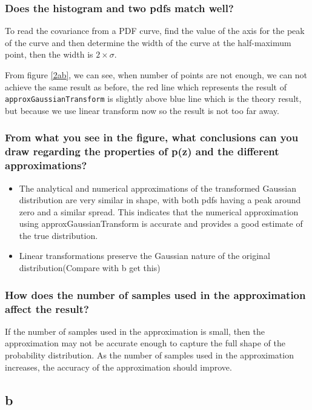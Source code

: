 \subsubsection{Does the histogram and two pdfs match well? }

To read the covariance from a PDF curve, find the value of the axis for the peak of the curve and then determine the width of the curve at the half-maximum point, then the width is $ 2 \times \sigma $. 


From figure \ref{2ab}, we can see, when number of points are not enough, we can not achieve the same result as before, the red line which represents the result of \texttt{approxGaussianTransform}  is slightly above blue line which is the theory result, but because we use linear transform now so the result is not too far away.

\subsubsection{From what you see in the figure, what conclusions can you draw regarding the properties of p(z) and the different approximations? }

\begin{itemize}
    \item The analytical and numerical approximations of the transformed Gaussian distribution are very similar in shape, with both pdfs having a peak around zero and a similar spread. This indicates that the numerical approximation using approxGaussianTransform is accurate and provides a good estimate of the true distribution.
    \item Linear transformations preserve the Gaussian nature of the original distribution(Compare with b get this)
\end{itemize}

\subsubsection{How does the number of samples used in the approximation affect the result?}

If the number of samples used in the approximation is small, then the approximation may not be accurate enough to capture the full shape of the probability distribution. As the number of samples used in the approximation increases, the accuracy of the approximation should improve.

\subsection{b}

